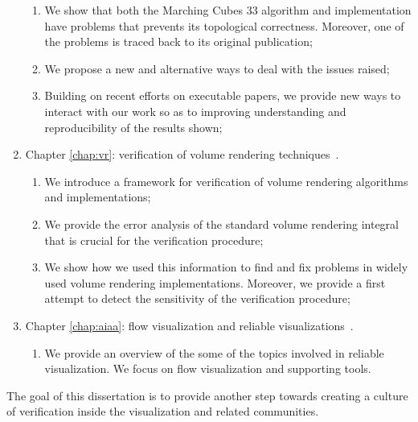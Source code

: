 \begin{enumerate}
\begin{enumerate}
\item We show that both the Marching Cubes 33 algorithm and implementation have problems that prevents its topological correctness. Moreover, one of the problems is traced back to its original publication;
\item We propose a new and alternative ways to deal with the issues raised;
\item Building on recent efforts on executable papers, we provide new ways to interact with our work so as to improving understanding and reproducibility of the results shown;
\end{enumerate}
\item Chapter \ref{chap:vr}: verification of volume rendering techniques~\cite{Etiene:2013}.
\begin{enumerate}
\item We introduce a framework for verification of volume rendering algorithms and implementations;
\item We provide the error analysis of the standard volume rendering integral that is crucial for the verification procedure;
\item We show how we used this information to find and fix problems in widely used volume rendering  implementations. Moreover, we provide a first attempt to detect the sensitivity of the verification procedure;
\end{enumerate}
\item Chapter \ref{chap:aiaa}: flow visualization and reliable visualizations~\cite{Etiene:Flow:2013}.
\begin{enumerate}
\item We provide an overview of the some of the topics involved in reliable visualization. We focus on flow visualization and supporting tools.
\end{enumerate}
\end{enumerate}
The goal of this dissertation is to provide another step towards creating a culture of verification inside the visualization and related communities.

